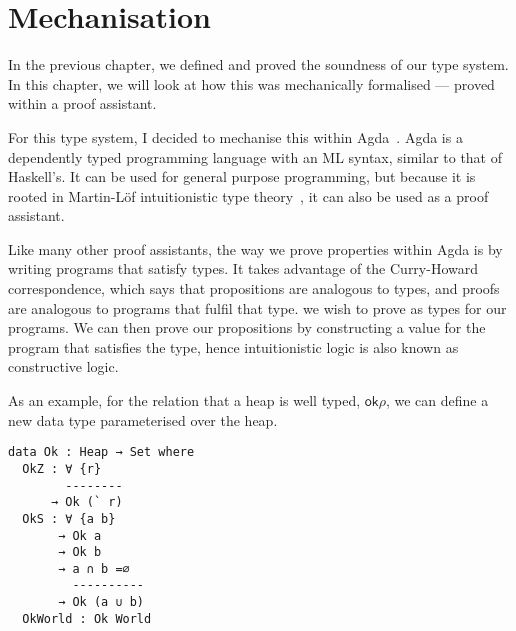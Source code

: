 \chapter{Mechanisation}\label{cha:mechanisation}

In the previous chapter, we defined and proved the soundness of our
type system. In this chapter, we will look at how this was
mechanically formalised --- proved within a proof assistant.

For this type system, I decided to mechanise this within
Agda~\cite{norell2009}. Agda is a dependently typed programming
language with an ML syntax, similar to that of Haskell's. It can be
used for general purpose programming, but because it is rooted in
Martin-Löf intuitionistic type theory~\cite{martin-lof1984}, it can
also be used as a proof assistant.

Like many other proof assistants, the way we prove properties within
Agda is by writing programs that satisfy types. It takes advantage of the
Curry-Howard correspondence, which says that propositions are
analogous to types, and proofs are analogous to programs that fulfil
that type.
we wish to prove as types for our programs. We can then prove our
propositions by constructing a value for the program that satisfies the
type, hence intuitionistic logic is also known as constructive logic.

As an example, for the relation that a heap is well typed,
$\textsf{ok} \rho$, we can define a new data type parameterised over the
heap.

\begin{verbatim}
data Ok : Heap → Set where
  OkZ : ∀ {r}
        --------
      → Ok (` r)
  OkS : ∀ {a b}
       → Ok a
       → Ok b
       → a ∩ b =∅
         ----------
       → Ok (a ∪ b)
  OkWorld : Ok World
\end{verbatim}